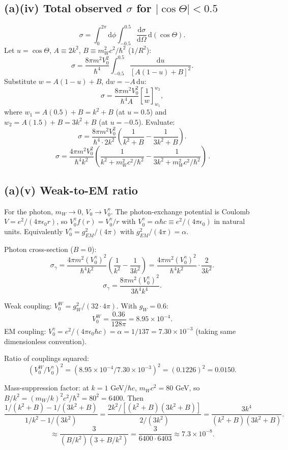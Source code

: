 \documentclass[11pt]{article}
\newcommand{\de}{\mathrm{d}}
\begin{document}
\subsection*{(a)(iv) Total observed $\sigma$ for $|\cos\Theta|<0.5$}

\[ \sigma = \int_0^{2\pi}\!\de\phi\!\int_{-0.5}^{0.5}\!\frac{\de\sigma}{\de\Omega}\,\de(\cos\Theta). \]
Let $u=\cos\Theta$, $A\equiv 2k^2$, $B\equiv m_W^2 c^2/\hbar^2$ ($1/R^2$):
\[ \sigma = \frac{8\pi m^2 V_0^2}{\hbar^4}\!\int_{-0.5}^{0.5}\!\frac{\de u}{[A(1-u)+B]^2}. \]
Substitute $w = A(1-u)+B$, $\de w = -A\,\de u$:
\[ \sigma = \frac{8\pi m^2 V_0^2}{\hbar^4 A}\!\left[\frac{1}{w}\right]_{w_1}^{w_2}, \]
where $w_1 = A(0.5)+B = k^2 + B$ (at $u=0.5$) and $w_2 = A(1.5)+B = 3k^2 + B$ (at $u=-0.5$).
Evaluate:
\[ \sigma = \frac{8\pi m^2 V_0^2}{\hbar^4\cdot 2k^2}\!\left(\frac{1}{k^2+B} - \frac{1}{3k^2+B}\right). \]
\[ \boxed{\,\sigma = \frac{4\pi m^2 V_0^2}{\hbar^4 k^2}\!\left(\frac{1}{k^2 + m_W^2c^2/\hbar^2} - \frac{1}{3k^2 + m_W^2c^2/\hbar^2}\right)\,}. \]

\subsection*{(a)(v) Weak-to-EM ratio}

For the photon, $m_W\to 0$, $V_0\to V_0^{\gamma}$. The photon-exchange potential is Coulomb $V=e^2/(4\pi\epsilon_0 r)$, so $V_0^\gamma f(r)=V_0^\gamma/r$ with $V_0^\gamma=\alpha\hbar c\equiv e^2/(4\pi\epsilon_0)$ in natural units. Equivalently $V_0^\gamma=g_{EM}^2/(4\pi)$ with $g_{EM}^2/(4\pi)=\alpha$.

Photon cross-section ($B=0$):
\[ \sigma_\gamma = \frac{4\pi m^2 (V_0^\gamma)^2}{\hbar^4 k^2}\!\left(\frac{1}{k^2} - \frac{1}{3k^2}\right) = \frac{4\pi m^2 (V_0^\gamma)^2}{\hbar^4 k^2}\cdot\frac{2}{3k^2}. \]
\[ \sigma_\gamma = \frac{8\pi m^2 (V_0^\gamma)^2}{3\hbar^4 k^4}. \]

Weak coupling: $V_0^W = g_W^2/(32\cdot 4\pi)$. With $g_W=0.6$:
\[ V_0^W = \frac{0.36}{128\pi} = 8.95\times 10^{-4}. \]
EM coupling: $V_0^\gamma = e^2/(4\pi\epsilon_0\hbar c) = \alpha = 1/137 = 7.30\times 10^{-3}$ (taking same dimensionless convention).

Ratio of couplings squared:
\[ (V_0^W/V_0^\gamma)^2 = (8.95\times 10^{-4}/7.30\times 10^{-3})^2 = (0.1226)^2 = 0.0150. \]

Mass-suppression factor: at $k = 1$ GeV/$\hbar c$, $m_W c^2 = 80$ GeV, so $B/k^2 = (m_W/k)^2 c^2/\hbar^2 = 80^2 = 6400$. Then
\[ \frac{1/(k^2+B) - 1/(3k^2+B)}{1/k^2 - 1/(3k^2)} = \frac{2k^2/[(k^2+B)(3k^2+B)]}{2/(3k^2)} = \frac{3k^4}{(k^2+B)(3k^2+B)}. \]
\[ \approx \frac{3}{(B/k^2)(3+B/k^2)} = \frac{3}{6400\cdot 6403} \approx 7.3\times 10^{-8}. \]
\end{document}
